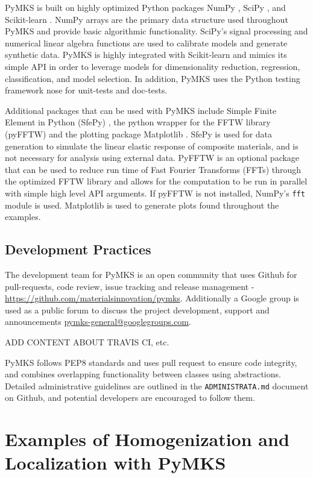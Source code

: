 \documentclass{bmcart}
\begin{document}
PyMKS is built on highly optimized Python packages NumPy \cite{van2011numpy}, SciPy \cite{jones2014scipy}, and Scikit-learn \cite{pedregosa2011scikit}. NumPy arrays are the primary data structure used throughout PyMKS and provide basic algorithmic functionality. SciPy's signal processing and numerical linear algebra functions are used to calibrate models and generate synthetic data. PyMKS is highly integrated with Scikit-learn and mimics its simple API in order to leverage models for dimensionality reduction, regression, classification, and model selection. In addition, PyMKS uses the Python testing framework nose for unit-tests and doc-tests.

Additional packages that can be used with PyMKS include Simple Finite Element in Python (SfePy) \cite{cimrman2014sfepy}, the python wrapper for the FFTW library (pyFFTW) \cite{frigo1998fftw} and the plotting package Matplotlib \cite{hunter2007matplotlib}. SfePy is used for data generation to simulate the linear elastic response of composite materials, and is not necessary for analysis using external data. PyFFTW is an optional package that can be used to reduce run time of Fast Fourier Transforms (FFTs) through the optimized FFTW library and allows for the computation to be run in parallel with simple high level API arguments. If pyFFTW is not installed, NumPy's \texttt{fft} module is used. Matplotlib is used to generate plots found throughout the examples.

\subsection{Development Practices}

The development team for PyMKS is an open community that uses Github for pull-requests, code review, issue tracking and release management - \\ \url{https://github.com/materialsinnovation/pymks}. Additionally a Google group is used as a public forum to discuss the project development, support and announcements \url{pymks-general@googlegroups.com}.

ADD CONTENT ABOUT TRAVIS CI, etc.

PyMKS follows PEP8 standards and uses pull request to ensure code integrity, and combines overlapping functionality between classes using abstractions. Detailed administrative guidelines are outlined in the \texttt{ADMINISTRATA.md} document on Github, and potential developers are encouraged to follow them.

\section{Examples of Homogenization and Localization with PyMKS}
\end{document}

